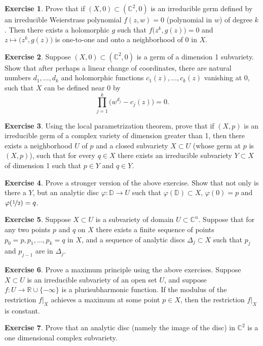 \documentclass[12pt,openany]{book}
\newcommand{\C}{{\mathbb{C}}}
\newcommand{\R}{{\mathbb{R}}}
\newcommand{\D}{{\mathbb{D}}}
\theoremstyle{plain}
\theoremstyle{remark}
\theoremstyle{definition}
\newenvironment{exbox}{%
    \def\FrameCommand{\vrule width 1pt \relax\hspace {10pt}}%
    \MakeFramed {\advance \hsize -\width \FrameRestore }%
}{%
    \endMakeFramed
}
\theoremstyle{exercise}
\newtheorem{exercise}{Exercise}[section]
\theoremstyle{example}
\begin{document}
\begin{exbox}
\begin{exercise}
Prove that if $(X,0) \subset (\C^2,0)$ is an irreducible germ defined
by an irreducible Weierstrass polynomial $f(z,w) = 0$ (polynomial in $w$)
of degree $k$.  Then there exists a holomorphic $g$ such that
$f\bigl(z^k,g(z)\bigr) = 0$ and $z \mapsto \bigl(z^k,g(z)\bigr)$
is one-to-one and onto a neighborhood of 0 in $X$.
\end{exercise}

\begin{exercise}
Suppose $(X,0) \subset (\C^2,0)$ is a germ of a dimension 1 subvariety.
Show that after perhaps a linear change of coordinates,
there are natural numbers
$d_1,\ldots,d_k$
and
holomorphic functions $c_1(z),\ldots,c_k(z)$ vanishing at $0$,
such that $X$ can be defined near 0 by
\begin{equation*}
\prod_{j=1}^k {\bigl( w^{d_j} - c_j(z) \bigr)} = 0.
\end{equation*}
\end{exercise}

\begin{exercise}
Using the local parametrization theorem, prove that
if $(X,p)$ is an irreducible germ of a complex variety of dimension greater
than 1, then there exists a neighborhood $U$ of $p$ and a closed subvariety
$X \subset U$ (whose germ at $p$ is $(X,p)$), such that for every
$q \in X$ there exists an irreducible subvariety $Y \subset X$
of dimension 1 such that $p \in Y$ and $q \in Y$.
\end{exercise}

\begin{exercise}
Prove a stronger version of the above exercise.  Show that not only is there
a $Y$, but an analytic disc $\varphi \colon \D \to U$ such that
$\varphi(\D) \subset X$, $\varphi(0) = p$ and $\varphi(\nicefrac{1}{2}) =
q$.
\end{exercise}

\begin{exercise}
Suppose $X \subset U$ is a subvariety of domain $U \subset \C^n$.
Suppose that for any two points $p$ and $q$ on $X$ there exists a finite sequence
of points $p_0 = p, p_1, \ldots, p_k = q$ in $X$, and a sequence of analytic discs
$\Delta_j \subset X$ such that $p_{j}$ and $p_{j-1}$ are in $\Delta_j$.
\end{exercise}

\begin{exercise}
Prove a maximum principle using the above exercises.
Suppose $X \subset U$ is an irreducible subvariety of an open set $U$,
and suppose $f \colon U \to \R \cup \{ - \infty \}$
is a plurisubharmonic function.  If the modulus of the restriction $f|_X$
achieves a maximum
at some point $p \in X$, then the restriction $f|_X$ is constant.
\end{exercise}

\begin{exercise}
Prove that an analytic disc (namely the image of the disc) in $\C^2$
is a one dimensional complex subvariety.
\end{exercise}
\end{exbox}
\end{document}
